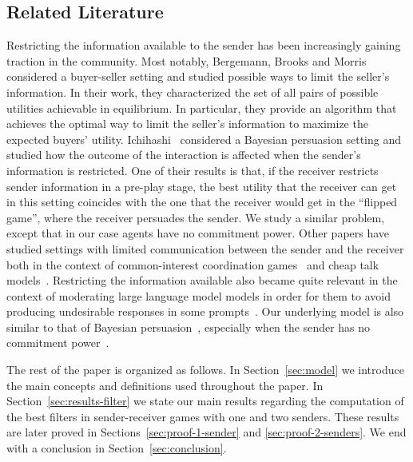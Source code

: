 \documentclass[submission,copyright,creativecommons]{eptcs}
\begin{document}
\subsection{Related Literature}

Restricting the information available to the sender has been increasingly gaining traction in the community. Most notably, Bergemann, Brooks and Morris~\cite{bergemann2015limits} considered a buyer-seller setting and studied possible ways to limit the seller's information. In their work, they characterized the set of all pairs of possible utilities achievable in equilibrium. In particular, they provide an algorithm that achieves the optimal way to limit the seller's information to maximize the expected buyers' utility. Ichihashi~\cite{ichihashi2019limiting} considered a Bayesian persuasion setting and studied how the outcome of the interaction is affected when the sender's information is restricted. One of their results is that, if the receiver restricts sender information in a pre-play stage, the best utility that the receiver can get in this setting coincides with the one that the receiver would get in the ``flipped game'', where the receiver persuades the sender. 
We study a similar problem, except that in our case agents have no commitment power.
Other papers have studied settings with limited communication between the sender and the receiver both in the context of common-interest coordination games~\cite{blume2013language, de2003game} and cheap talk models~\cite{jager2011voronoi, hagenbach2020cheap}. Restricting the  information available also became quite relevant in the context of moderating large language model models in order for them to avoid producing undesirable responses in some prompts~\cite{patil2023can,liu2024protecting,glukhov2023llm}. Our underlying model is also similar to that of Bayesian persuasion~\cite{kamenica2011bayesian}, especially when the sender has no commitment power~\cite{lipnowski2020cheap, corrao2023mediated, arieli2023mediated, arieli2023resilient}.

The rest of the paper is organized as follows. In Section~\ref{sec:model} we introduce the main concepts and definitions used throughout the paper. 
In Section~\ref{sec:results-filter} we state our main results regarding the computation of the best filters in sender-receiver games with one and two senders. These results are later proved in Sections~\ref{sec:proof-1-sender} and \ref{sec:proof-2-senders}. We end with a conclusion in Section~\ref{sec:conclusion}.
\end{document}
